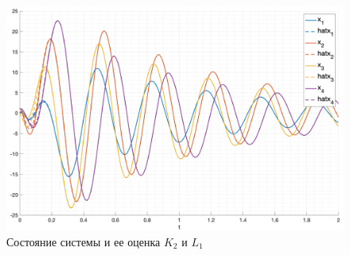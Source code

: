 \begin{figure}[ht!]
    \centering
    \includegraphics[width=\textwidth]{media/plots/task2_3_xh.png}
    \caption{Состояние системы и ее оценка $K_2$ и $L_1$}
    \label{fig:task2_2_1_xh}
\end{figure}
\FloatBarrier

